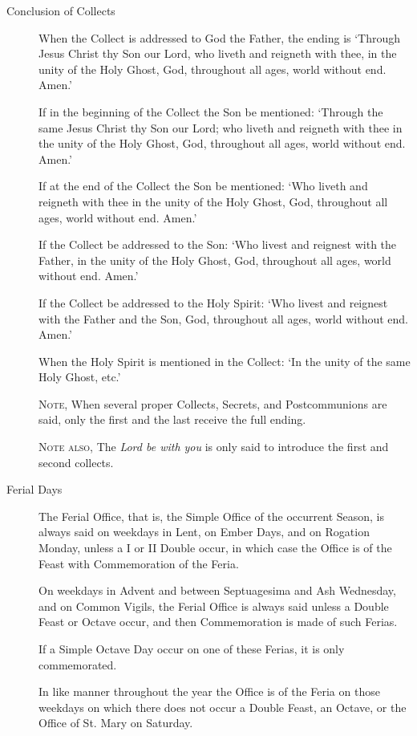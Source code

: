 \begin{description}
\item[Conclusion of Collects] When the Collect is addressed to God the Father, the ending is `Through Jesus Christ thy Son our Lord, who liveth and reigneth with thee, in the unity of the Holy Ghost, God, throughout all ages, world without end. Amen.'\par
If in the beginning of the Collect the Son be mentioned: `Through the same Jesus Christ thy Son our Lord; who liveth and reigneth with thee in the unity of the Holy Ghost, God, throughout all ages, world without end. Amen.'\par
If at the end of the Collect the Son be mentioned: `Who liveth and reigneth with thee in the unity of the Holy Ghost, God, throughout all ages, world without end. Amen.'\par
If the Collect be addressed to the Son: `Who livest and reignest with the Father, in the unity of the Holy Ghost, God, throughout all ages, world without end. Amen.'\par
If the Collect be addressed to the Holy Spirit: `Who livest and reignest with the Father and the Son, God, throughout all ages, world without end. Amen.'\par
When the Holy Spirit is mentioned in the Collect: `In the unity of the same Holy Ghost, etc.'

\textsc{Note,} When several proper Collects, Secrets, and Postcommunions are said, only the first and the last receive the full ending.\par
	\textsc{Note also,} The \emph{Lord be with you} is only said to introduce the first and second collects.

\item[Ferial Days] The Ferial Office, that is, the Simple Office of the occurrent Season, is always said on weekdays in Lent, on Ember Days, and on Rogation Monday, unless a I or II Double occur, in which case the Office is of the Feast with Commemoration of the Feria.\par
On weekdays in Advent and between Septuagesima and Ash Wednesday, and on Common Vigils, the Ferial Office is always said unless a Double Feast or Octave occur, and then Commemoration is made of such Ferias.\par
If a Simple Octave Day occur on one of these Ferias, it is only commemorated.\par
In like manner throughout the year the Office is of the Feria on those weekdays on which there does not occur a Double Feast, an Octave, or the Office of St. Mary on Saturday.



\end{description}
